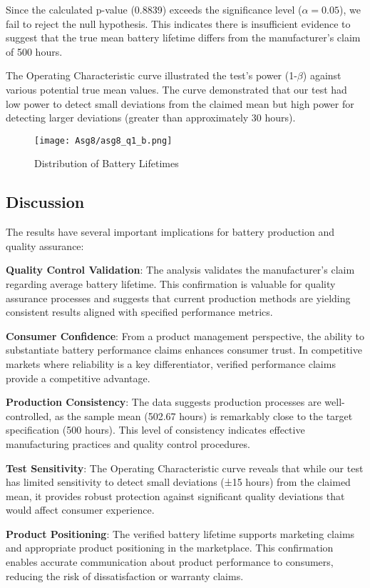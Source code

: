 \documentclass[12pt]{article}
\begin{document}
Since the calculated p-value (0.8839) exceeds the significance level ($\alpha = 0.05$), we fail to reject the null hypothesis. This indicates there is insufficient evidence to suggest that the true mean battery lifetime differs from the manufacturer's claim of 500 hours.

The Operating Characteristic curve illustrated the test's power (1-$\beta$) against various potential true mean values. The curve demonstrated that our test had low power to detect small deviations from the claimed mean but high power for detecting larger deviations (greater than approximately 30 hours).
\begin{figure}[H]
    \centering
    \texttt{[image: Asg8/asg8\_q1\_b.png]}
    \caption{Distribution of Battery Lifetimes}
    \label{fig:enter-label}
\end{figure}
\subsection{Discussion}
The results have several important implications for battery production and quality assurance:

\textbf{Quality Control Validation}: The analysis validates the manufacturer's claim regarding average battery lifetime. This confirmation is valuable for quality assurance processes and suggests that current production methods are yielding consistent results aligned with specified performance metrics.

\textbf{Consumer Confidence}: From a product management perspective, the ability to substantiate battery performance claims enhances consumer trust. In competitive markets where reliability is a key differentiator, verified performance claims provide a competitive advantage.

\textbf{Production Consistency}: The data suggests production processes are well-controlled, as the sample mean (502.67 hours) is remarkably close to the target specification (500 hours). This level of consistency indicates effective manufacturing practices and quality control procedures.

\textbf{Test Sensitivity}: The Operating Characteristic curve reveals that while our test has limited sensitivity to detect small deviations (±15 hours) from the claimed mean, it provides robust protection against significant quality deviations that would affect consumer experience.

\textbf{Product Positioning}: The verified battery lifetime supports marketing claims and appropriate product positioning in the marketplace. This confirmation enables accurate communication about product performance to consumers, reducing the risk of dissatisfaction or warranty claims.
\end{document}
